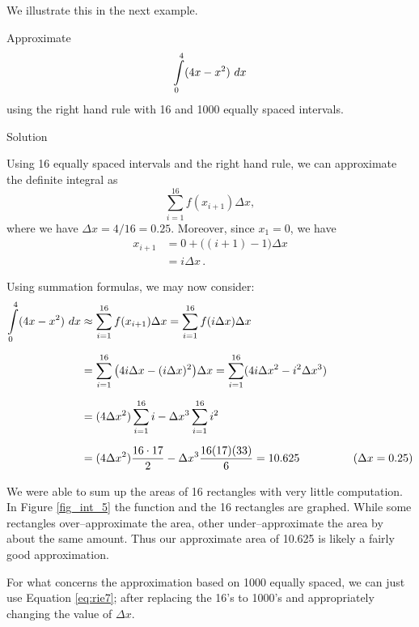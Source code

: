 We illustrate this in the next example.

\begin{example}\label{ex_rie7}
Approximate 
$$\displaystyle\int\limits_0^4(4x-x^2)\ dx$$
 using the right hand rule with 16 and 1000 equally spaced intervals.

Solution 

Using 16 equally spaced intervals and the right hand rule, we can approximate the definite integral as $$\sum_{i=1}^{16}f(x_{i+1})\Delta x,$$
where we have $\Delta x = 4/16 = 0.25$. Moreover, since $x_1=0$, we have 
\begin{align*}
x_{i+1} &= 0 + \big((i+1)-1\big)\Delta x \\
				&=	i\Delta x\,.
\end{align*}

Using summation formulas, we may now consider:
\allowdisplaybreaks
\begin{align}
\displaystyle\int\limits_0^4 (4x-x^2)\ dx &\approx \sum_{i=1}^{16} f(x_{i+1})\Delta x = \sum_{i=1}^{16} f(i\Delta x) \Delta x \notag\\[0.2cm]
                                    &= \sum_{i=1}^{16} \big(4i\Delta x - (i\Delta x)^2\big)\Delta x = \sum_{i=1}^{16} (4i\Delta x^2 - i^2\Delta x^3)\notag\\[0.2cm] 
									&= (4\Delta x^2)\sum_{i=1}^{16} i - \Delta x^3 \sum_{i=1}^{16} i^2 \label{eq:rie7}\\[0.2cm]
									&= (4\Delta x^2)\frac{16\cdot 17}{2} - \Delta x^3 \frac{16(17)(33)}6=10.625 &\quad \text{ $(\Delta x = 0.25)$}\notag\\[0.2cm]
\end{align}
We were able to sum up the areas of 16 rectangles with very little computation. In Figure \ref{fig_int_5} the function and the 16 rectangles are graphed. While some rectangles over--approximate the area, other under--approximate the area by about the same amount. Thus our approximate area of 10.625 is likely a fairly good approximation.


For what concerns the approximation based on 1000 equally spaced, we can just use Equation \eqref{eq:rie7}; after replacing the 16's to 1000's and appropriately changing the value of $\Delta x$.


\end{example}

